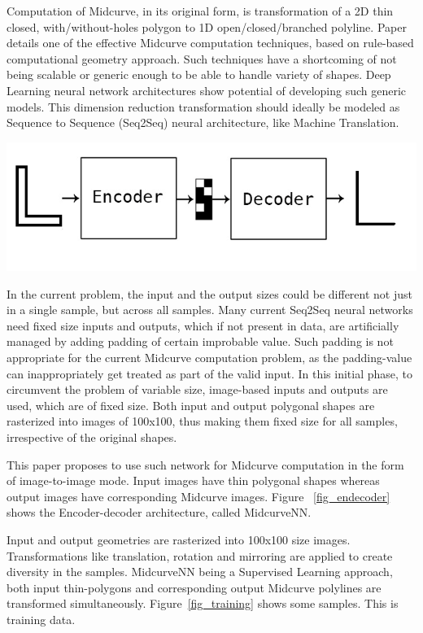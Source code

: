 \documentclass[9pt,academicons]{article}
\begin{document}
		
Computation of Midcurve, in its original form, is transformation of a 2D thin closed, with/without-holes polygon to 1D open/closed/branched polyline. Paper \cite{dimred2017} details one of the effective Midcurve computation techniques, based on rule-based computational geometry approach. Such techniques have a shortcoming of not being scalable or generic enough to be able to handle variety of shapes. Deep Learning neural network architectures show potential of developing such generic models. This dimension reduction transformation should ideally be modeled as Sequence to Sequence (Seq2Seq) neural architecture, like Machine Translation. 

     \begin{center}
	\includegraphics[width=0.8\linewidth]{images/Midcurve_encoder_decoder}
	\label{fig_endecoder}
    \end{center}
    
    
In the current problem, the input and the output sizes could be different not just in a single sample, but across all samples. Many current Seq2Seq neural networks need fixed size inputs and outputs, which if not present in data, are artificially managed by adding padding of certain improbable value. Such padding is not appropriate for the current Midcurve computation problem, as the padding-value can inappropriately get treated as part of the valid input. In this initial phase, to circumvent the problem of variable size, image-based inputs and outputs are used, which are of fixed size. Both input and output polygonal shapes are rasterized into images of 100x100, thus making them fixed size for all samples, irrespective of the original shapes.

This paper proposes to use such network for Midcurve computation in the form of image-to-image mode. Input images have thin polygonal shapes whereas output images have corresponding Midcurve images. Figure ~\ref{fig_endecoder} shows the Encoder-decoder architecture, called MidcurveNN.


    
Input and output geometries are rasterized into 100x100 size images. Transformations like translation, rotation and mirroring are applied to create diversity in the samples. MidcurveNN being a Supervised Learning approach, both input thin-polygons and corresponding output Midcurve polylines are transformed simultaneously. Figure~\ref{fig_training} shows some samples. This is training data.    
\end{document}
